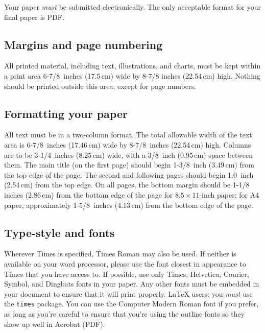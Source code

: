 \documentclass[10pt,twocolumn]{article}
\newcommand{\latex}{\LaTeX\xspace}
\begin{document}
Your paper \emph{must} be submitted electronically.  The only acceptable
format for your final paper is PDF.

\subsection{Margins and page numbering}

All printed material, including text, illustrations, and charts, must
be kept within a print area 6-7/8~inches (17.5\,cm) wide by 8-7/8
inches (22.54\,cm) high.  Nothing should be printed outside this area,
except for page numbers.

\subsection{Formatting your paper}

All text must be in a two-column format. The total allowable width of
the text area is 6-7/8~inches (17.46\,cm) wide by 8-7/8~inches
(22.54\,cm) high. Columns are to be 3-1/4~inches (8.25\,cm) wide, with
a 3/8~inch (0.95\,cm) space between them. The main title (on the first
page) should begin 1-3/8~inch (3.49\,cm) from the top edge of the
page. The second and following pages should begin 1.0~inch (2.54\,cm)
from the top edge. On all pages, the bottom margin should be 1-1/8
inches (2.86\,cm) from the bottom edge of the page for $8.5 \times
11$-inch paper; for A4 paper, approximately 1-5/8~inches (4.13\,cm)
from the bottom edge of the page.

\subsection{Type-style and fonts}

Wherever Times is specified, Times Roman may also be used. If neither
is available on your word processor, please use the font closest in
appearance to Times that you have access to.  If possible, use only
Times, Helvetica, Courier, Symbol, and Dingbats fonts in your paper.
Any other fonts must be embedded in your document to ensure that it
will print properly.  \latex users: you \emph{must} use the
\texttt{times} package.  You can use the Computer Modern Roman font
if you prefer, as long as you're careful to ensure that you're using
the outline fonts so they show up well in Acrobat (PDF).
\end{document}
